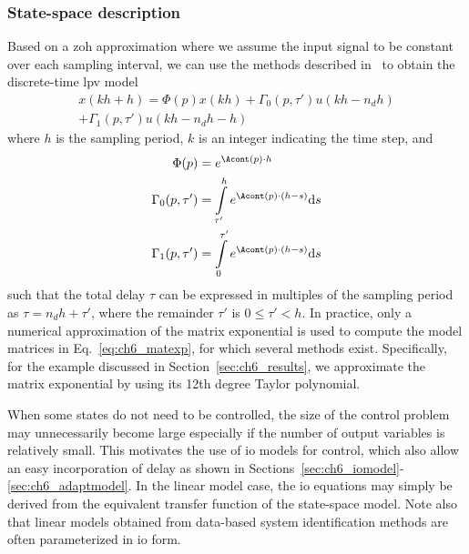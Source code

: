 \subsubsection{State-space description}
Based on a \gls{zoh} approximation where we assume the input signal to be constant over each sampling interval, we can use the methods described in~\cite{aastrom2013computer} to obtain the discrete-time \gls{lpv} model
\begin{multline}\label{eq:ch6_ssd}
    x(kh+h) = \Phi(p) x(kh) +  \Gamma_0(p,\tau') u(kh-n_{d}h) \\+ \Gamma_1(p,\tau') u(kh-n_{d}h - h)
\end{multline}
where $h$ is the sampling period, $k$ is an integer indicating the time step, and
\begin{subequations}\label{eq:ch6_matexp}
\begin{align}
    \Phi(p) &= e^{\Acont (p)\cdot h} \\ 
    \Gamma_0(p,\tau') &= \int\limits_{\tau'}^{h} e^{\Acont (p)\cdot(h-s)}\text{d}s \\ 
    \Gamma_1(p,\tau') &= \int\limits_{0}^{\tau'} e^{\Acont (p)\cdot(h-s)}\text{d}s \label{eq:ch6_gam1}
\end{align}
\end{subequations}
such that the total delay $\tau$ can be expressed in multiples of the sampling period as $\tau = n_{d}h+\tau'$, where the remainder $\tau'$ is $0\leq \tau' <h$. In practice, only a numerical approximation of the matrix exponential is used to compute the model matrices in Eq.~\eqref{eq:ch6_matexp}, for which several methods exist. Specifically, for the example discussed in Section~\ref{sec:ch6_results}, we approximate the matrix exponential by using its 12th degree Taylor polynomial.

When some states do not need to be controlled, the size of the control problem may unnecessarily become large especially if the number of output variables is relatively small. This motivates the use of \gls{io} models for control, which also allow an easy incorporation of delay as shown in Sections~\ref{sec:ch6_iomodel}-\ref{sec:ch6_adaptmodel}. In the linear model case, the \gls{io} equations may simply be derived from the equivalent transfer function of the state-space model. Note also that linear models obtained from data-based system identification methods are often parameterized in \gls{io} form. 

